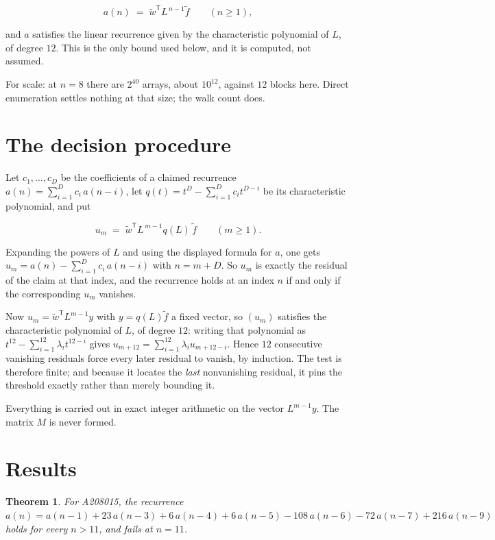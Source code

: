 \documentclass[11pt]{article}
\newtheorem{theorem}{Theorem}
\theoremstyle{definition}
\begin{document}
\[a(n) \;=\; \tilde w^{\mathsf T} L^{\,n-1} \tilde f \qquad (n \ge 1),\]

and $a$ satisfies the linear recurrence given by the characteristic polynomial of $L$, of degree $12$. This is the only bound used below, and it is computed, not assumed.

For scale: at $n = 8$ there are $2^{40}$ arrays, about $10^{12}$, against $12$ blocks here. Direct enumeration settles nothing at that size; the walk count does.

\section{The decision procedure}

Let $c_1,\dots,c_D$ be the coefficients of a claimed recurrence $a(n) = \sum_{i=1}^{D} c_i\,a(n-i)$, let $q(t) = t^{D} - \sum_{i=1}^{D} c_i t^{D-i}$ be its characteristic polynomial, and put

\[u_m \;=\; \tilde w^{\mathsf T} L^{\,m-1} q(L)\,\tilde f \qquad (m \ge 1).\]

Expanding the powers of $L$ and using the displayed formula for $a$, one gets $u_m = a(n) - \sum_{i=1}^{D} c_i\,a(n-i)$ with $n = m + D$. So $u_m$ is exactly the residual of the claim at that index, and the recurrence holds at an index $n$ if and only if the corresponding $u_m$ vanishes.

Now $u_m = \tilde w^{\mathsf T} L^{m-1} y$ with $y = q(L)\tilde f$ a fixed vector, so $(u_m)$ satisfies the characteristic polynomial of $L$, of degree $12$: writing that polynomial as $t^{12} - \sum_{i=1}^{12} \lambda_i t^{12-i}$ gives $u_{m+12} = \sum_{i=1}^{12} \lambda_i u_{m+12-i}$. Hence $12$ consecutive vanishing residuals force every later residual to vanish, by induction. The test is therefore finite; and because it locates the {\itshape last} nonvanishing residual, it pins the threshold exactly rather than merely bounding it.

Everything is carried out in exact integer arithmetic on the vector $L^{m-1}y$. The matrix $M$ is never formed.

\section{Results}

\begin{theorem} For A208015, the recurrence $a(n) = a(n-1) + 23\,a(n-3) + 6\,a(n-4) + 6\,a(n-5) - 108\,a(n-6) - 72\,a(n-7) + 216\,a(n-9)$ holds for every $n > 11$, and fails at $n = 11$.\end{theorem}
\end{document}
